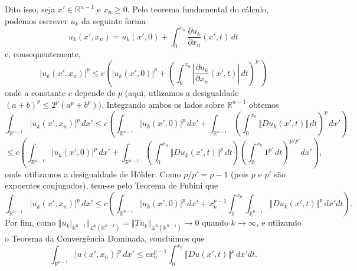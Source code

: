 \documentclass[a4paper, 11pt]{book}
\theoremstyle{definition}
\newcommand{\bR}{\mathbb{R}}
\newcommand{\cL}{\mathcal{L}}
\begin{document}
\begin{prf}
    Dito isso, seja $x' \in \bR^{n-1}$ e $x_n \geqslant 0$.
    Pelo teorema fundamental do cálculo, podemos escrever $u_k$ da seguinte forma
    \[
        u_k(x'\!,x_n) = u_k(x'\!,0) + \int_0^{x_n} \dfrac{\partial u_k}{\partial x_n} (x'\!,t) \,dt
    \]
    e, consequentemente,
    \[
        |u_k(x'\!,x_n)|^p \leqslant c \left(  |u_k(x'\!,0)|^p + \left(  \int_0^{x_n} \left|\dfrac{\partial u_k}{\partial x_n} (x'\!,t)\right| \,dt\right)^{\!p\,} \right)
    \]
    onde a constante $c$ depende de $p$ (aqui, utlizamos a desigualdade $(a + b)^p \leqslant 2^p (a^p + b^p)$). Integrando ambos os lados sobre $\bR^{n-1}$ obtemos
    \[
        \int_{\bR^{n-1}} |u_k(x',x_n)|^p \,dx' \leqslant c \left( \int_{\bR^{n-1}} |u_k(x',0)|^p \,dx' + \int_{\bR^{n-1}} \left(  \int_0^{x_n} \Vert Du_k(x',t) \Vert \,dt\right)^{\!p\,} dx' \right)
    \]
    \[
        \leqslant  c \left( \int_{\bR^{n-1}} |u_k(x',0)|^p \,dx' + \int_{\bR^{n-1}} \left( \int_0^{x_n} \Vert Du_k (x',t) \Vert^p \,dt \right)\left( \int_0^{x_n} 1^{p'} \,dt \right)^{p/p'} dx'\right),
    \]
    onde utilizamos a desigualdade de Hölder.
    Como $p/p' = p-1$ (pois $p$ e $p'$ são expoentes conjugados), tem-se pelo Teorema de Fubini que
    \[
        \int_{\bR^{n-1}} |u_k(x',x_n)|^p \,dx' \leqslant c \left( \int_{\bR^{n-1}} |u_k(x',0)|^p \,dx' + x_n^{p-1} \int_{0}^{x_n} \int_{\bR^{n-1}} \Vert Du_k (x',t) \Vert^p  \,dx'dt \right).
    \]
    Por fim, como $\Vert u_k |_{\bR^{n-1}} \Vert_{\cL^p(\bR^{n-1})} = \Vert Tu_k \Vert_{\cL^p(\bR^{n-1})} \to 0$ quando $k \to \infty$, e utlizando o Teorema da Convergência Dominada, concluimos que
    \begin{equation} \label{eq:uuuuu}
        \int_{\bR^{n-1}} |u(x',x_n)|^p \,dx' \leqslant  c x_n^{p-1}\int_0^{x_n} \Vert Du(x',t) \Vert^p \,dx'dt.
    \end{equation}
    

\end{prf}
\end{document}
